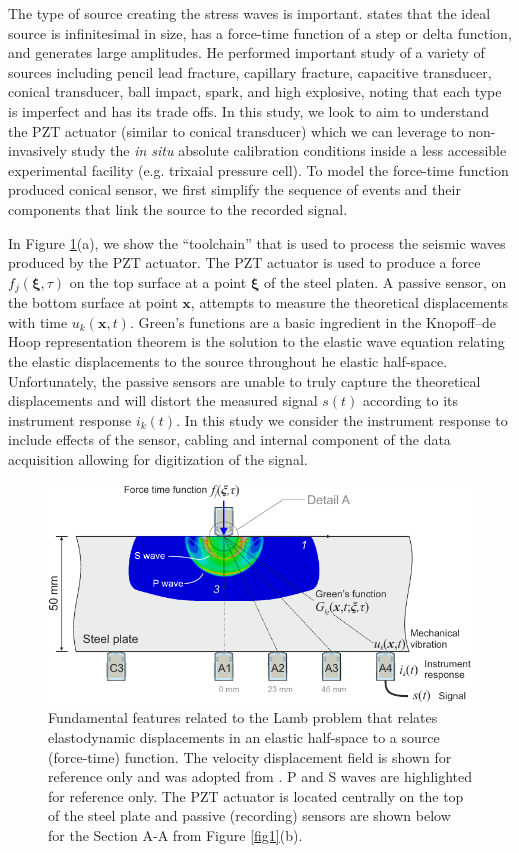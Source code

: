\documentclass[preprint,3p, 11pt,authoryear]{elsarticle}
\begin{document}
The type of source creating the stress waves is important. \citet{Breckenridge1990} states that the ideal source is infinitesimal in size, has a force-time function of a step or delta function, and generates large amplitudes. He performed important study of a variety of sources including pencil lead fracture, capillary fracture, capacitive transducer, conical transducer, ball impact, spark, and high explosive, noting that each type is imperfect and has its trade offs. In this study, we look to aim to understand the PZT actuator (similar to conical transducer) which we can leverage to non-invasively study the \textit{in situ} absolute calibration conditions inside a less accessible experimental facility (e.g. trixaial pressure cell). To model the force-time function produced conical sensor, we first simplify the sequence of events and their components that link the source to the recorded signal.

In Figure \ref{fig2}(a), we show the ``toolchain'' that is used to process the seismic waves produced by the PZT actuator. The PZT actuator is used to produce a force $f_{j}\left( \mathbf{\xi}, \tau \right)$ on the top surface at a point $\mathbf{\xi}$ of the steel platen. A passive sensor, on the bottom surface at point $\mathbf{x}$, attempts to measure the theoretical displacements with time $u_{k}\left( \mathbf{x}, t \right)$. Green’s functions are a basic ingredient in the Knopoff--de Hoop representation theorem \citep{Burridge1964} is the solution to the elastic wave equation relating the elastic displacements to the source throughout he elastic half-space. Unfortunately, the passive sensors are unable to truly capture the theoretical displacements and will distort the measured signal $s(t)$ according to its instrument response $i_{k}(t)$.  In this study we consider the instrument response to include effects of the sensor, cabling and internal component of the data acquisition allowing for digitization of the signal. 

\begin{figure}[h]
     	\centering
\includegraphics[scale= 1.0]{FIG2.pdf} 
\caption{Fundamental features related to the Lamb problem that relates elastodynamic displacements in an elastic half-space to a source (force-time) function. The velocity displacement field is shown for reference only and was adopted from \citet{Selvadurai2019}. P and S waves are highlighted for reference only. The PZT actuator is located centrally on the top of the steel plate and passive (recording) sensors are shown below for the Section A-A from Figure \ref{fig1}(b).}
	\label{fig2} 
\end{figure}
\end{document}
